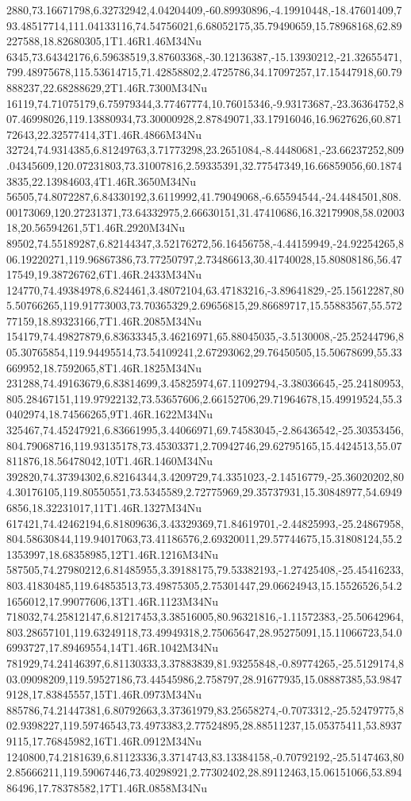 2880,73.16671798,6.32732942,4.04204409,-60.89930896,-4.19910448,-18.47601409,793.48517714,111.04133116,74.54756021,6.68052175,35.79490659,15.78968168,62.89227588,18.82680305,1T1.46R1.46M34Nu
6345,73.64342176,6.59638519,3.87603368,-30.12136387,-15.13930212,-21.32655471,799.48975678,115.53614715,71.42858802,2.4725786,34.17097257,17.15447918,60.79888237,22.68288629,2T1.46R.7300M34Nu
16119,74.71075179,6.75979344,3.77467774,10.76015346,-9.93173687,-23.36364752,807.46998026,119.13880934,73.30000928,2.87849071,33.17916046,16.9627626,60.87172643,22.32577414,3T1.46R.4866M34Nu
32724,74.9314385,6.81249763,3.71773298,23.2651084,-8.44480681,-23.66237252,809.04345609,120.07231803,73.31007816,2.59335391,32.77547349,16.66859056,60.18743835,22.13984603,4T1.46R.3650M34Nu
56505,74.8072287,6.84330192,3.6119992,41.79049068,-6.65594544,-24.4484501,808.00173069,120.27231371,73.64332975,2.66630151,31.47410686,16.32179908,58.0200318,20.56594261,5T1.46R.2920M34Nu
89502,74.55189287,6.82144347,3.52176272,56.16456758,-4.44159949,-24.92254265,806.19220271,119.96867386,73.77250797,2.73486613,30.41740028,15.80808186,56.4717549,19.38726762,6T1.46R.2433M34Nu
124770,74.49384978,6.824461,3.48072104,63.47183216,-3.89641829,-25.15612287,805.50766265,119.91773003,73.70365329,2.69656815,29.86689717,15.55883567,55.57277159,18.89323166,7T1.46R.2085M34Nu
154179,74.49827879,6.83633345,3.46216971,65.88045035,-3.5130008,-25.25244796,805.30765854,119.94495514,73.54109241,2.67293062,29.76450505,15.50678699,55.33669952,18.7592065,8T1.46R.1825M34Nu
231288,74.49163679,6.83814699,3.45825974,67.11092794,-3.38036645,-25.24180953,805.28467151,119.97922132,73.53657606,2.66152706,29.71964678,15.49919524,55.30402974,18.74566265,9T1.46R.1622M34Nu
325467,74.45247921,6.83661995,3.44066971,69.74583045,-2.86436542,-25.30353456,804.79068716,119.93135178,73.45303371,2.70942746,29.62795165,15.4424513,55.07811876,18.56478042,10T1.46R.1460M34Nu
392820,74.37394302,6.82164344,3.4209729,74.3351023,-2.14516779,-25.36020202,804.30176105,119.80550551,73.5345589,2.72775969,29.35737931,15.30848977,54.69496856,18.32231017,11T1.46R.1327M34Nu
617421,74.42462194,6.81809636,3.43329369,71.84619701,-2.44825993,-25.24867958,804.58630844,119.94017063,73.41186576,2.69320011,29.57744675,15.31808124,55.21353997,18.68358985,12T1.46R.1216M34Nu
587505,74.27980212,6.81485955,3.39188175,79.53382193,-1.27425408,-25.45416233,803.41830485,119.64853513,73.49875305,2.75301447,29.06624943,15.15526526,54.21656012,17.99077606,13T1.46R.1123M34Nu
718032,74.25812147,6.81217453,3.38516005,80.96321816,-1.11572383,-25.50642964,803.28657101,119.63249118,73.49949318,2.75065647,28.95275091,15.11066723,54.06993727,17.89469554,14T1.46R.1042M34Nu
781929,74.24146397,6.81130333,3.37883839,81.93255848,-0.89774265,-25.5129174,803.09098209,119.59527186,73.44545986,2.758797,28.91677935,15.08887385,53.98479128,17.83845557,15T1.46R.0973M34Nu
885786,74.21447381,6.80792663,3.37361979,83.25658274,-0.7073312,-25.52479775,802.9398227,119.59746543,73.4973383,2.77524895,28.88511237,15.05375411,53.89379115,17.76845982,16T1.46R.0912M34Nu
1240800,74.2181639,6.81123336,3.3714743,83.13384158,-0.70792192,-25.5147463,802.85666211,119.59067446,73.40298921,2.77302402,28.89112463,15.06151066,53.89486496,17.78378582,17T1.46R.0858M34Nu
